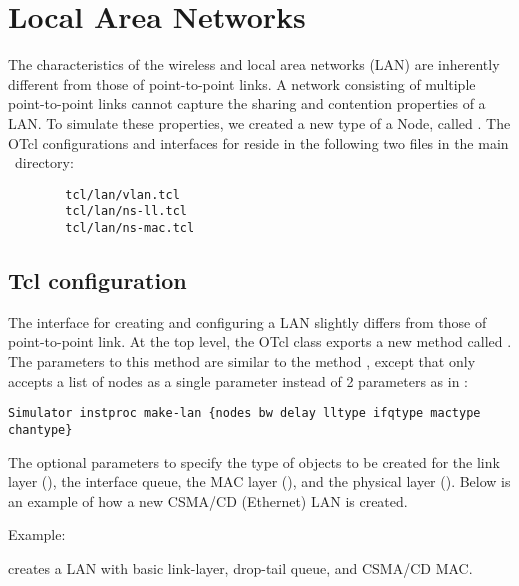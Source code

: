 %


%
%
\chapter{Local Area Networks}
\label{chap:lan}

The characteristics of the wireless and local area networks (LAN) are
inherently different from those of point-to-point links.  A network
consisting of multiple point-to-point links cannot capture the sharing
and contention properties of a LAN.  To simulate these properties, we
created a new type of a Node, called .  The OTcl
configurations and interfaces for  reside in the following
two files in the main \ns\ directory:

\begin{verbatim}
        tcl/lan/vlan.tcl
        tcl/lan/ns-ll.tcl
        tcl/lan/ns-mac.tcl
\end{verbatim}

\section{Tcl configuration}
\label{sec:lan_tcl}

The interface for creating and configuring a LAN slightly differs from
those of point-to-point link.  At the top level, the OTcl class
 exports a new method called .  The
parameters to this method are similar to the method ,
except that  only accepts a list of nodes as a single
parameter instead of 2 parameters as in :

\begin{verbatim}
Simulator instproc make-lan {nodes bw delay lltype ifqtype mactype chantype}
\end{verbatim}

The optional parameters to  specify the type of objects
to be created for the link layer (), the interface queue, the
MAC layer (), and the physical layer ().  Below
is an example of how a new CSMA/CD (Ethernet) LAN is created.

Example:
creates a LAN with basic link-layer, drop-tail queue, and CSMA/CD MAC.


